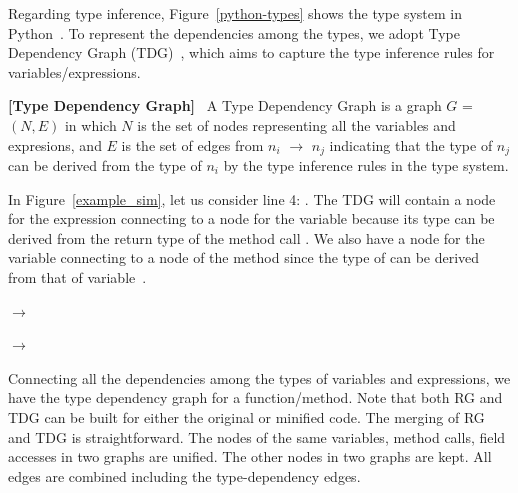 Regarding type inference, Figure~\ref{python-types} shows the type
system in Python~\cite{HiTyper-icse22}. To represent the dependencies
among the types, we adopt Type Dependency Graph
(TDG)~\cite{HiTyper-icse22}, which aims to capture the type inference
rules for variables/expressions.

\begin{definition}{\bf [Type Dependency Graph]}~\cite{HiTyper-icse22}
    \label{tdg-def}
A Type Dependency Graph is a graph $G$ = $(N,E)$ in which $N$ is the
set of nodes representing all the variables and expresions, and $E$ is
the set of edges from $n_i$ $\rightarrow$ $n_j$ indicating that the type of $n_j$
can be derived from the type of $n_i$ by the type inference rules in
the type system.
\end{definition}

In Figure~\ref{example_sim}, let us consider line 4: . The TDG will contain a node for the expression
 connecting to a node for the variable 
because its type can be derived from the return type of the method
call . We also have a node for the variable
 connecting to a node of the method 
since the type of  can be derived from
that of variable~.

 $\rightarrow$ 

 $\rightarrow$  


Connecting all the dependencies among the types of variables and
expressions, we have the type dependency graph for a
function/method. Note that both RG and TDG can be built for either
the original or minified code. The merging of RG and TDG is
straightforward. The nodes of the same variables, method calls, field
accesses in two graphs are unified.  The other nodes in two graphs are
kept. All edges are combined including the type-dependency edges.

